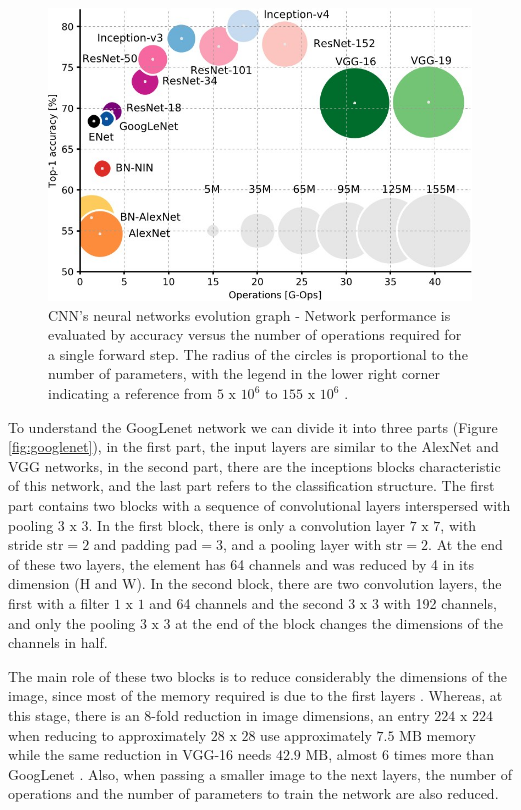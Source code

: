 \begin{figure}
    \centering
    \includegraphics[scale=0.4]{"Part 3 - Learning Systems/Supervised Learning/Deep Learning/images/figure131.jpg"}
    \caption{ CNN's neural networks evolution graph - Network performance is evaluated by accuracy versus the number of operations required for a single forward step. The radius of the circles is proportional to the number of parameters, with the legend in the lower right corner indicating a reference from $5\text{ x }10^6$ to $155\text{ x }10^6$ \cite{canziani2016}.}
    \label{fig:neuralevolution}
\end{figure}

To understand the GoogLenet network we can divide it into three parts (Figure \ref{fig:googlenet}), in the first part, the input layers are similar to the AlexNet and VGG networks, in the second part, there are the inceptions blocks characteristic of this network, and the last part refers to the classification structure. The first part contains two blocks with a sequence of convolutional layers interspersed with pooling $3\text{ x }3$. In the first block, there is only a convolution layer $7\text{ x }7$, with stride $\text{str} = 2$ and padding $\text{pad}= 3$, and a pooling layer with $\text{str} = 2$. At the end of these two layers, the element has 64 channels and was reduced by 4 in its dimension (H and W). In the second block, there are two convolution layers, the first with a filter $1\text{ x }1$ and 64 channels and the second $3\text{ x }3$ with 192 channels, and only the pooling $3\text{ x }3$ at the end of the block changes the dimensions of the channels in half.

The main role of these two blocks is to reduce considerably the dimensions of the image, since most of the memory required is due to the first layers \cite{johnson2019}. Whereas, at this stage, there is an 8-fold reduction in image dimensions, an entry $224\text{ x }224$ when reducing to approximately $28\text{ x }28$ use approximately $7.5 \text{ MB}$ memory while the same reduction in VGG-16 needs $42.9 \text{ MB}$, almost $6$ times more than GoogLenet \cite{johnson2019}. Also, when passing a smaller image to the next layers, the number of operations and the number of parameters to train the network are also reduced.


